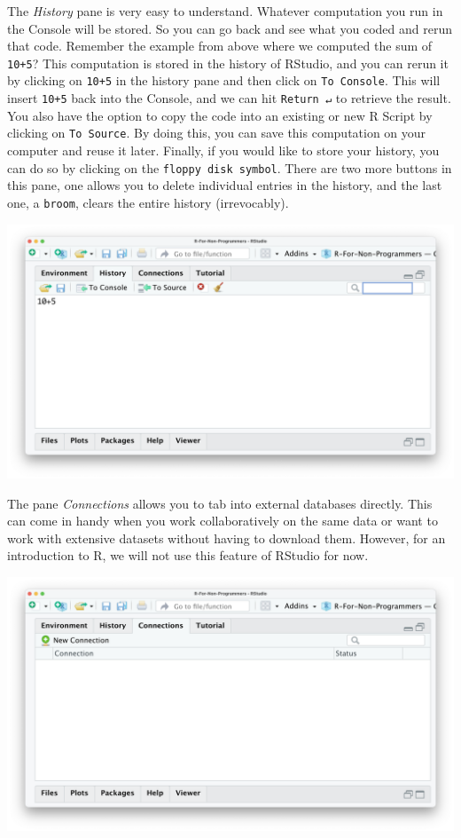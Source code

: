 \documentclass[
]{book}
\begin{document}
The \emph{History} pane is very easy to understand. Whatever computation you run in the Console will be stored. So you can go back and see what you coded and rerun that code. Remember the example from above where we computed the sum of \texttt{10+5}? This computation is stored in the history of RStudio, and you can rerun it by clicking on \texttt{10+5} in the history pane and then click on \texttt{To\ Console}. This will insert \texttt{10+5} back into the Console, and we can hit \texttt{Return\ ↵} to retrieve the result. You also have the option to copy the code into an existing or new R Script by clicking on \texttt{To\ Source}. By doing this, you can save this computation on your computer and reuse it later. Finally, if you would like to store your history, you can do so by clicking on the \texttt{floppy\ disk\ symbol}. There are two more buttons in this pane, one allows you to delete individual entries in the history, and the last one, a \texttt{broom}, clears the entire history (irrevocably).

\includegraphics{images/chapter_04_img/04_environment_history_etc/02_rstudio_history.png}

The pane \emph{Connections} allows you to tab into external databases directly. This can come in handy when you work collaboratively on the same data or want to work with extensive datasets without having to download them. However, for an introduction to R, we will not use this feature of RStudio for now.

\includegraphics{images/chapter_04_img/04_environment_history_etc/03_rstudio_connections.png}
\end{document}
